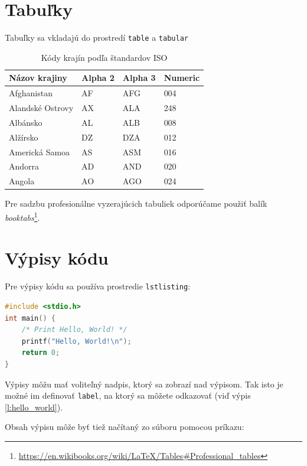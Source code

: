 \section{Tabuľky}

Tabuľky sa vkladajú do prostredí \texttt{table} a \texttt{tabular}

\begin{table}[!ht]
	\caption{Kódy krajín podľa štandardov ISO}\label{t:1}
	\smallskip
	\centering

	\begin{tabular}{llll}
		\toprule
		Názov krajiny & Alpha 2 & Alpha 3 & Numeric\\
		\midrule
		Afghanistan & AF & AFG & 004\\
		Alandské Ostrovy & AX & ALA & 248\\
		Albánsko & AL & ALB & 008\\
		Alžírsko & DZ & DZA & 012\\
		Americká Samoa & AS & ASM & 016\\
		Andorra & AD & AND & 020\\
		Angola & AO & AGO & 024\\
		\toprule
	\end{tabular}
\end{table}

Pre sadzbu profesionálne vyzerajúcich tabuliek odporúčame použiť balík \emph{booktabs}\footnote{\url{https://en.wikibooks.org/wiki/LaTeX/Tables\#Professional_tables}}.


\section{Výpisy kódu}

Pre výpisy kódu sa používa prostredie \texttt{lstlisting}:

\begin{lstlisting}[language=C,caption={Program, ktorý pozdraví celý svet}, label={l:hello_world}]
#include <stdio.h>
int main() {
    /* Print Hello, World! */
    printf("Hello, World!\n");
    return 0;
}
\end{lstlisting}

Výpisy môžu mať voliteľný nadpis, ktorý sa zobrazí nad výpisom. Tak isto je možné im definovať \texttt{label}, na ktorý sa môžete odkazovať (viď výpis \ref{l:hello_world}).

Obsah výpisu môže byť tiež načítaný zo súboru pomocou príkazu:




